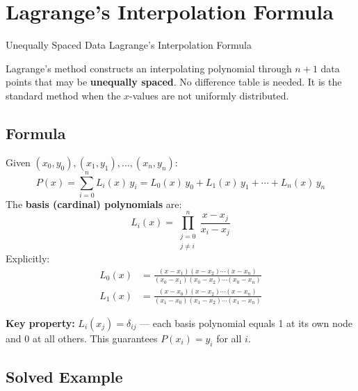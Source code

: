 \documentclass[12pt]{article}
\begin{document}
\newpage
\section{Lagrange's Interpolation Formula}

\begin{methodtitle}{Unequally Spaced Data}{}
  Lagrange's Interpolation Formula
\end{methodtitle}

\begin{defbox}
Lagrange's method constructs an interpolating polynomial through $n+1$ data points that may be \textbf{unequally spaced}. No difference table is needed. It is the standard method when the $x$-values are not uniformly distributed.
\end{defbox}

\subsection*{Formula}

\begin{thmbox}
Given $(x_0,y_0),(x_1,y_1),\ldots,(x_n,y_n)$:
\[
  P(x) = \sum_{i=0}^{n} L_i(x)\,y_i
  = L_0(x)\,y_0 + L_1(x)\,y_1 + \cdots + L_n(x)\,y_n
\]
The \textbf{basis (cardinal) polynomials} are:
\[
  L_i(x) = \prod_{\substack{j=0\\j\neq i}}^{n}\frac{x-x_j}{x_i-x_j}
\]
Explicitly:
\begin{align*}
  L_0(x) &= \frac{(x-x_1)(x-x_2)\cdots(x-x_n)}{(x_0-x_1)(x_0-x_2)\cdots(x_0-x_n)} \\[4pt]
  L_1(x) &= \frac{(x-x_0)(x-x_2)\cdots(x-x_n)}{(x_1-x_0)(x_1-x_2)\cdots(x_1-x_n)}
\end{align*}
\end{thmbox}

\begin{keybox}
\textbf{Key property:} $L_i(x_j) = \delta_{ij}$ — each basis polynomial equals 1 at its own node and 0 at all others. This guarantees $P(x_i) = y_i$ for all $i$.
\end{keybox}

\subsection*{Solved Example}
\end{document}

